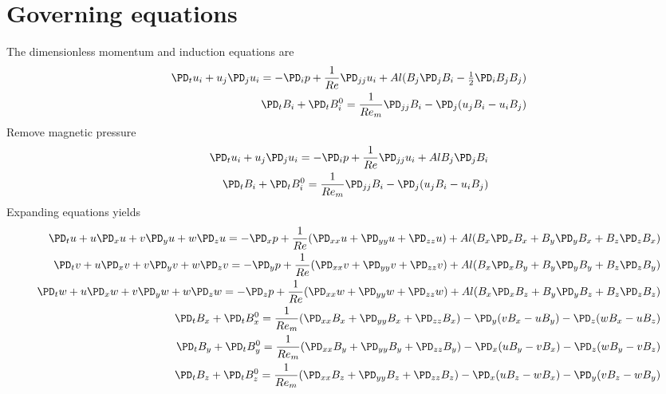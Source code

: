 \documentclass[11pt]{article}
\begin{document}
\doublespacing
\MOONSTITLE
\maketitle

\section{Governing equations}
The dimensionless momentum and induction equations are
\begin{equation}\begin{aligned}
\PD_t u_i+u_j\PD_j u_i = -\PD_i p+ \frac{1}{Re} \PD_{jj} u_i + Al (B_j \PD_j B_i - \tfrac{1}{2} \PD_i B_j B_j) \\
\PD_t B_i + \PD_t B_i^0 = \frac{1}{Re_m} \PD_{jj} B_i - \PD_j (u_j B_i - u_i B_j)
\end{aligned} \end{equation}
Remove magnetic pressure
\begin{equation}\begin{aligned}
\PD_t u_i+u_j\PD_j u_i = -\PD_i p+ \frac{1}{Re} \PD_{jj} u_i + Al B_j \PD_j B_i \\
\PD_t B_i + \PD_t B_i^0 = \frac{1}{Re_m} \PD_{jj} B_i - \PD_j (u_j B_i - u_i B_j)
\end{aligned} \end{equation}
Expanding equations yields
\begin{equation}\begin{aligned}
\PD_t u+ u\PD_x u + v\PD_y u + w\PD_z u = -\PD_x p+ \frac{1}{Re} (\PD_{xx} u+\PD_{yy} u+\PD_{zz} u) + Al (B_x \PD_x B_x + B_y \PD_y B_x + B_z \PD_z B_x) \\
\PD_t v+ u\PD_x v + v\PD_y v + w\PD_z v = -\PD_y p+ \frac{1}{Re} (\PD_{xx} v+\PD_{yy} v+\PD_{zz} v) + Al (B_x \PD_x B_y + B_y \PD_y B_y + B_z \PD_z B_y) \\
\PD_t w+ u\PD_x w + v\PD_y w + w\PD_z w = -\PD_z p+ \frac{1}{Re} (\PD_{xx} w+\PD_{yy} w+\PD_{zz} w) + Al (B_x \PD_x B_z + B_y \PD_y B_z + B_z \PD_z B_z) \\
\PD_t B_x + \PD_t B_x^0 = \frac{1}{Re_m} (\PD_{xx} B_x + \PD_{yy} B_x+\PD_{zz} B_x)                         - \PD_y (v B_x - u B_y) - \PD_z (w B_x - u B_z) \\
\PD_t B_y + \PD_t B_y^0 = \frac{1}{Re_m} (\PD_{xx} B_y + \PD_{yy} B_y+\PD_{zz} B_y) - \PD_x (u B_y - v B_x)                         - \PD_z (w B_y - v B_z) \\
\PD_t B_z + \PD_t B_z^0 = \frac{1}{Re_m} (\PD_{xx} B_z + \PD_{yy} B_z+\PD_{zz} B_z) - \PD_x (u B_z - w B_x) - \PD_y (v B_z - w B_y)                         \\
\end{aligned} \end{equation}
\end{document}
